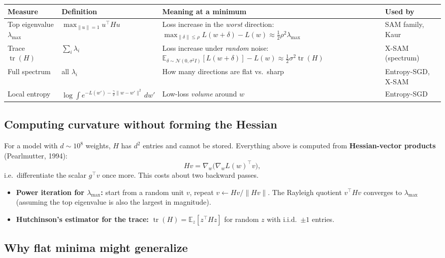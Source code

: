\documentclass[11pt]{article}
\newcommand{\E}{\mathbb{E}}
\newcommand{\lmax}{\lambda_{\max}}
\newcommand{\tr}{\operatorname{tr}}
\newcommand{\N}{\mathcal{N}}
\theoremstyle{plain}
\begin{document}
\begin{center}\small
\begin{tabularx}{\textwidth}{@{}p{3.6cm}p{5.4cm}Lp{2.2cm}@{}}
\toprule
\textbf{Measure} & \textbf{Definition} & \textbf{Meaning at a minimum} & \textbf{Used by} \\
\midrule
Top eigenvalue $\lmax$ & $\max_{\|u\|=1} u^\top H u$ & Loss increase in the \emph{worst} direction: $\max_{\|\delta\|\le\rho} L(w+\delta) - L(w) \approx \tfrac12\rho^2\lmax$ & SAM family, Kaur \\
Trace $\tr(H)$ & $\sum_i \lambda_i$ & Loss increase under \emph{random} noise: $\E_{\delta\sim\N(0,\sigma^2 I)}[L(w+\delta)] - L(w) \approx \tfrac12\sigma^2\tr(H)$ & X-SAM (spectrum) \\
Full spectrum & all $\lambda_i$ & How many directions are flat vs.\ sharp & Entropy-SGD, X-SAM \\
Local entropy & $\log\!\int e^{-L(w') - \frac{\gamma}{2}\|w-w'\|^2}\,dw'$ & Low-loss \emph{volume} around $w$ & Entropy-SGD \\
\bottomrule
\end{tabularx}
\end{center}

\subsection{Computing curvature without forming the Hessian}

For a model with $d \sim 10^8$ weights, $H$ has $d^2$ entries and cannot be stored. Everything above is computed
from \textbf{Hessian-vector products} (Pearlmutter, 1994):
\begin{equation}
  Hv = \nabla_w\big(\nabla_w L(w)^\top v\big),
\end{equation}
i.e.\ differentiate the scalar $g^\top v$ once more. This costs about two backward passes.
\begin{itemize}
  \item \textbf{Power iteration for $\lmax$:} start from a random unit $v$, repeat $v \leftarrow Hv / \|Hv\|$. The Rayleigh quotient
        $v^\top H v$ converges to $\lmax$ (assuming the top eigenvalue is also the largest in magnitude).
  \item \textbf{Hutchinson's estimator for the trace:} $\tr(H) = \E_z[z^\top H z]$ for random $z$ with i.i.d.\ $\pm1$ entries.
\end{itemize}

\subsection{Why flat minima might generalize}
\end{document}
